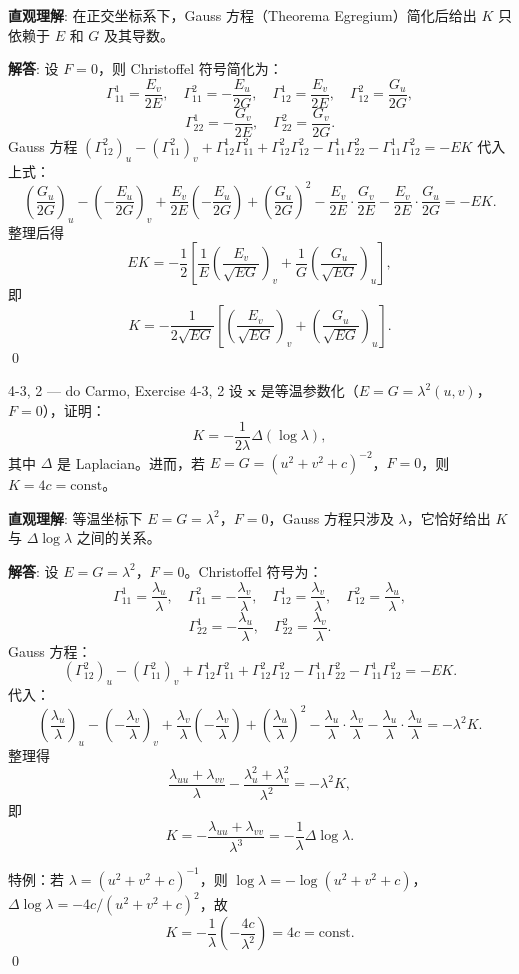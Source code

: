 \begin{solution}
\textbf{直观理解}: 在正交坐标系下，Gauss 方程（Theorema Egregium）简化后给出 $K$ 只依赖于 $E$ 和 $G$ 及其导数。

\textbf{解答}: 设 $F=0$，则 Christoffel 符号简化为：
\[
\Gamma_{11}^1 = \frac{E_v}{2E},\quad \Gamma_{11}^2 = -\frac{E_u}{2G},\quad
\Gamma_{12}^1 = \frac{E_v}{2E},\quad \Gamma_{12}^2 = \frac{G_u}{2G},
\]
\[
\Gamma_{22}^1 = -\frac{G_v}{2E},\quad \Gamma_{22}^2 = \frac{G_v}{2G}.
\]
Gauss 方程 $(\Gamma_{12}^2)_u - (\Gamma_{11}^2)_v + \Gamma_{12}^1\Gamma_{11}^2 + \Gamma_{12}^2\Gamma_{12}^2 - \Gamma_{11}^1\Gamma_{22}^2 - \Gamma_{11}^1\Gamma_{12}^2 = -EK$ 代入上式：
\[
\left(\frac{G_u}{2G}\right)_u - \left(-\frac{E_u}{2G}\right)_v + \frac{E_v}{2E}\left(-\frac{E_u}{2G}\right) + \left(\frac{G_u}{2G}\right)^2 - \frac{E_v}{2E}\cdot\frac{G_v}{2E} - \frac{E_v}{2E}\cdot\frac{G_u}{2G} = -EK.
\]
整理后得
\[
EK = -\frac{1}{2}\left[\frac{1}{E}\left(\frac{E_v}{\sqrt{EG}}\right)_v + \frac{1}{G}\left(\frac{G_u}{\sqrt{EG}}\right)_u\right],
\]
即
\[
K = -\frac{1}{2\sqrt{EG}}\left[\left(\frac{E_v}{\sqrt{EG}}\right)_v + \left(\frac{G_u}{\sqrt{EG}}\right)_u\right].
\]
\qed
\end{solution}

\begin{exercise}{4-3, 2 — do Carmo, Exercise 4-3, 2}
设 $\mathbf{x}$ 是等温参数化（$E=G=\lambda^2(u,v)$，$F=0$），证明：
\[
K = -\frac{1}{2\lambda}\Delta(\log\lambda),
\]
其中 $\Delta$ 是 Laplacian。进而，若 $E=G=(u^2+v^2+c)^{-2}$，$F=0$，则 $K=4c=\mathrm{const}$。
\end{exercise}

\begin{solution}
\textbf{直观理解}: 等温坐标下 $E=G=\lambda^2$，$F=0$，Gauss 方程只涉及 $\lambda$，它恰好给出 $K$ 与 $\Delta\log\lambda$ 之间的关系。

\textbf{解答}: 设 $E=G=\lambda^2$，$F=0$。Christoffel 符号为：
\[
\Gamma_{11}^1 = \frac{\lambda_u}{\lambda},\quad \Gamma_{11}^2 = -\frac{\lambda_v}{\lambda},\quad
\Gamma_{12}^1 = \frac{\lambda_v}{\lambda},\quad \Gamma_{12}^2 = \frac{\lambda_u}{\lambda},
\]
\[
\Gamma_{22}^1 = -\frac{\lambda_u}{\lambda},\quad \Gamma_{22}^2 = \frac{\lambda_v}{\lambda}.
\]
Gauss 方程：
\[
(\Gamma_{12}^2)_u - (\Gamma_{11}^2)_v + \Gamma_{12}^1\Gamma_{11}^2 + \Gamma_{12}^2\Gamma_{12}^2 - \Gamma_{11}^1\Gamma_{22}^2 - \Gamma_{11}^1\Gamma_{12}^2 = -EK.
\]
代入：
\[
\left(\frac{\lambda_u}{\lambda}\right)_u - \left(-\frac{\lambda_v}{\lambda}\right)_v + \frac{\lambda_v}{\lambda}\left(-\frac{\lambda_v}{\lambda}\right) + \left(\frac{\lambda_u}{\lambda}\right)^2 - \frac{\lambda_u}{\lambda}\cdot\frac{\lambda_v}{\lambda} - \frac{\lambda_u}{\lambda}\cdot\frac{\lambda_u}{\lambda} = -\lambda^2K.
\]
整理得
\[
\frac{\lambda_{uu}+\lambda_{vv}}{\lambda} - \frac{\lambda_u^2+\lambda_v^2}{\lambda^2} = -\lambda^2K,
\]
即
\[
K = -\frac{\lambda_{uu}+\lambda_{vv}}{\lambda^3} = -\frac{1}{\lambda}\Delta\log\lambda.
\]

特例：若 $\lambda = (u^2+v^2+c)^{-1}$，则 $\log\lambda = -\log(u^2+v^2+c)$，$\Delta\log\lambda = -4c/(u^2+v^2+c)^2$，故
\[
K = -\frac{1}{\lambda}\left(-\frac{4c}{\lambda^2}\right) = 4c = \mathrm{const}.
\]
\qed
\end{solution}

